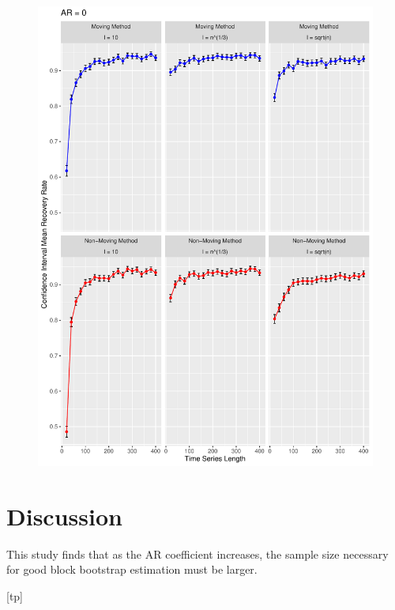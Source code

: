 \documentclass[12pt, letterpaper, titlepage]{article}
\begin{document}
\begin{figure}[p]
  \centering
  \includegraphics[width=\textwidth]{norm}
  \caption{}
  \label{fig:norm}
\end{figure}

%
%





\section{Discussion}
\label{sec:discuss}

This study finds that as the AR coefficient increases, the sample size necessary for good block bootstrap estimation must be larger.




[tp]
\end{document}

